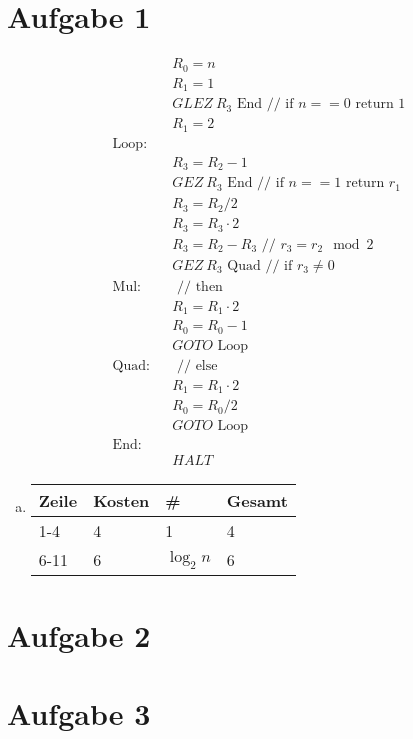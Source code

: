 




\newcommand{\nr}{2}


\section*{Aufgabe 1}
\begin{eqnarray}
&& R_0 = n\\
&& R_1 = 1\\
&& GLEZ\ R_3 \text{ End} \text{ // if $n==0$ return 1}\\
&& R_1 = 2\\
\text{Loop:}&&\\
    && R_3 = R_2 - 1\\
    && GEZ\ R_3 \text{ End} \text{ // if $n==1$ return $r_1$}\\
    && R_3 = R_2 / 2 \\
    && R_3 = R_3 \cdot 2 \\
    && R_3 = R_2 - R_3 \text{ // $r_3 = r_2 \mod 2$}\\
    && GEZ\ R_3 \text{ Quad} \text{ // if $r_3 \neq 0$ }\\
\text{Mul:}&& \text{ // then }\\
    && R_1 = R_1 \cdot 2\\
    && R_0 = R_0 - 1 \\
    && GOTO \text{ Loop}\\
\text{Quad:}&& \text{ // else }\\
    && R_1 = R_1 \cdot 2\\
    && R_0 = R_0 / 2\\
    && GOTO \text{ Loop}\\
\text{End:}&&\\
&& HALT
\end{eqnarray}

\begin{enumerate}[(a)]
\item

\begin{tabular}[h]{l|lll}
Zeile & Kosten & \# & Gesamt\\\hline
1-4  &  4 & 1 & 4\\
6-11 &  6 & $\log_2 n$ & 6\\
\end{tabular}
\end{enumerate}

\section*{Aufgabe 2}

\section*{Aufgabe 3}


